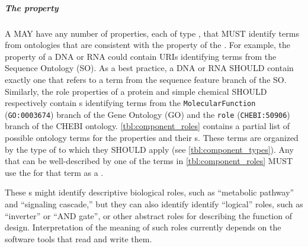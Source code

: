 \subparagraph{The  property}
\label{sec:role:C}

A  MAY have any number of  properties, each of type , that MUST identify terms from ontologies that are consistent with the  property of the .  
For example, the  property of a DNA or RNA  could contain URIs identifying terms from the Sequence Ontology (SO). As a best practice, a DNA or RNA  SHOULD contain exactly one  that refers to a term from the sequence feature branch of the SO.
Similarly, the role properties of a protein and simple chemical  SHOULD respectively contain s identifying terms from the \texttt{MolecularFunction} (\texttt{GO:0003674}) branch of the Gene Ontology (GO) and the \texttt{role} (\texttt{CHEBI:50906}) branch of the CHEBI ontology.
\ref{tbl:component_roles} contains a partial list of possible ontology terms for the  properties and their s. These terms are organized by the type of  to which they SHOULD apply (see \ref{tbl:component_types}). Any  that can be well-described by one of the terms in \ref{tbl:component_roles} MUST use the  for that term as a .

These s might identify descriptive biological roles, such as ``metabolic pathway'' and ``signaling cascade,'' but they can also identify identify ``logical'' roles, such as ``inverter'' or ``AND gate'', or other abstract roles for describing the function of design. Interpretation of the meaning of such roles currently depends on the software tools that read and write them.


